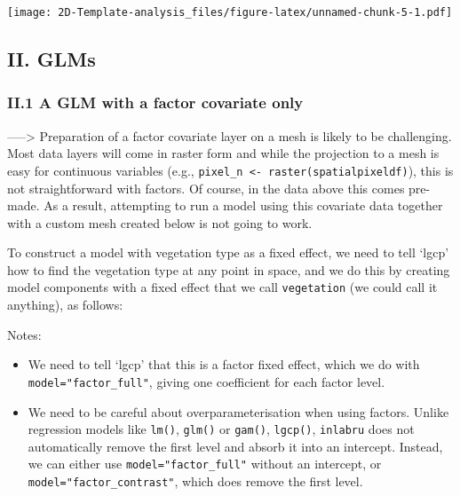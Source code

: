 \documentclass[
]{article}
\newenvironment{Shaded}{\begin{snugshade}}{\end{snugshade}}
\newcommand{\AttributeTok}[1]{\textcolor[rgb]{0.77,0.63,0.00}{#1}}
\newcommand{\DecValTok}[1]{\textcolor[rgb]{0.00,0.00,0.81}{#1}}
\newcommand{\FunctionTok}[1]{\textcolor[rgb]{0.00,0.00,0.00}{#1}}
\newcommand{\NormalTok}[1]{#1}
\newcommand{\OtherTok}[1]{\textcolor[rgb]{0.56,0.35,0.01}{#1}}
\newcommand{\SpecialCharTok}[1]{\textcolor[rgb]{0.00,0.00,0.00}{#1}}
\newcommand{\StringTok}[1]{\textcolor[rgb]{0.31,0.60,0.02}{#1}}
\providecommand{\tightlist}{%
  \setlength{\itemsep}{0pt}\setlength{\parskip}{0pt}}
\begin{document}
\texttt{[image: 2D-Template-analysis\_files/figure-latex/unnamed-chunk-5-1.pdf]}

\hypertarget{ii.-glms}{%
\subsection{II. GLMs}\label{ii.-glms}}

\hypertarget{ii.1-a-glm-with-a-factor-covariate-only}{%
\subsubsection{II.1 A GLM with a factor covariate
only}\label{ii.1-a-glm-with-a-factor-covariate-only}}

-----\textgreater{} Preparation of a factor covariate layer on a mesh is
likely to be challenging. Most data layers will come in raster form and
while the projection to a mesh is easy for continuous variables (e.g.,
\texttt{pixel\_n\ \textless{}-\ raster(spatialpixeldf)}), this is not
straightforward with factors. Of course, in the data above this comes
pre-made. As a result, attempting to run a model using this covariate
data together with a custom mesh created below is not going to work.

To construct a model with vegetation type as a fixed effect, we need to
tell `lgcp' how to find the vegetation type at any point in space, and
we do this by creating model components with a fixed effect that we call
\texttt{vegetation} (we could call it anything), as follows:

\begin{Shaded}
\end{Shaded}

Notes:

\begin{itemize}
\tightlist
\item
  We need to tell `lgcp' that this is a factor fixed effect, which we do
  with \texttt{model="factor\_full"}, giving one coefficient for each
  factor level.
\item
  We need to be careful about overparameterisation when using factors.
  Unlike regression models like \texttt{lm()}, \texttt{glm()} or
  \texttt{gam()}, \texttt{lgcp()}, \texttt{inlabru} does not
  automatically remove the first level and absorb it into an intercept.
  Instead, we can either use \texttt{model="factor\_full"} without an
  intercept, or \texttt{model="factor\_contrast"}, which does remove the
  first level.
\end{itemize}
\end{document}
